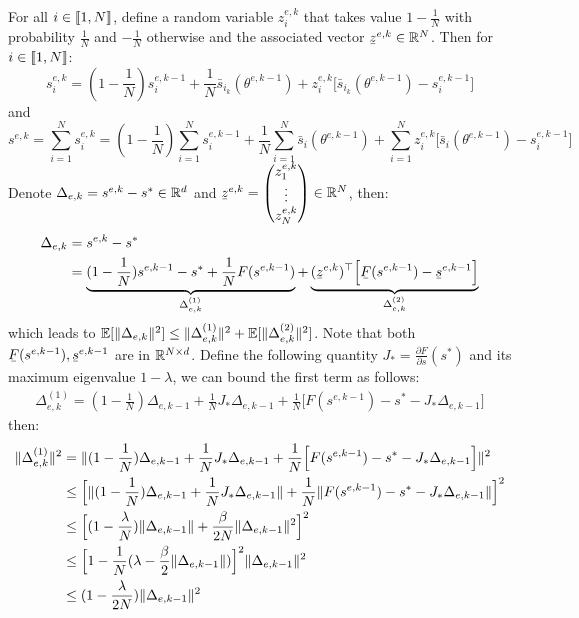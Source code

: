 For all $i \in \llbracket1,N\rrbracket$, define a random variable $z_i^{e,k}$ that takes value $1-\frac{1}{N}$ with probability $\frac{1}{N}$ and $-\frac{1}{N}$ otherwise and the associated vector $\barbelow{z}^{e,k} \in \rset^N$. Then for $i \in \llbracket1,N\rrbracket$:
\begin{equation}
s_i^{e,k} = (1-\frac{1}{N}) s_i^{e,k-1} + \frac{1}{N}\bar{s}_{i_k}(\theta^{e,k-1}) + z_i^{e,k} \Big[\bar{s}_{i_k}(\theta^{e,k-1}) - s_i^{e,k-1}\Big]
\end{equation}
and
\begin{equation}
s^{e,k} =  \sum_{i=1}^N s_i^{e,k} = (1-\frac{1}{N})  \sum_{i=1}^N s_i^{e,k-1} + \frac{1}{N}  \sum_{i=1}^N \bar{s}_i(\theta^{e,k-1}) +  \sum_{i=1}^N z_i^{e,k} \Big[\bar{s}_i(\theta^{e,k-1}) - s_i^{e,k-1}\Big]
\end{equation}
Denote $\Delta_{e,k} = s^{e,k} - s^* \in \mathbb{R}^{d}$ and  $\barbelow{z}^{e,k} = \begin{pmatrix} 
z_1^{e,k}  \\
\vdots  \\
z_N^{e,k}
\end{pmatrix} \in \rset^{N}$, then:
\begin{equation}
\begin{split}
\Delta_{e,k} & = s^{e,k} - s^* \\
& = \underbrace{(1-\frac{1}{N}) s^{e,k-1} - s^*  +  \frac{1}{N}  F(s^{e,k-1})}_{\Delta_{e,k}^{(1)}}  + \underbrace{(\barbelow{z}^{e,k})^\top \Big[ \barbelow{F}(s^{e,k-1}) - \barbelow{s}^{e,k-1} \Big]}_{\Delta_{e,k}^{(2)}}
\end{split}
\end{equation}
which leads to $\operatorname*{\mathbb{E}}[\lVert\Delta_{e,k}\rVert^2] \leq \lVert\Delta_{e,k}^{(1)}\rVert^2 + \operatorname*{\mathbb{E}}[\lVert\Delta_{e,k}^{(2)}\rVert^2] $. Note that both $\barbelow{F}(s^{e,k-1}), \barbelow{s}^{e,k-1}$ are in $\mathbb{R}^{N \times d}$.
Define the following quantity $J_* = \frac{\partial F}{\partial s}(s^*)$ and its maximum eigenvalue $1-\lambda$, we can bound the first term as follows:
\begin{equation}
\begin{split}
\Delta_{e,k}^{(1)} = (1-\frac{1}{N})\Delta_{e,k-1} + \frac{1}{N}J_* \Delta_{e,k-1} +  \frac{1}{N} \Big[ F(s^{e,k-1}) - s^* -J_* \Delta_{e,k-1}\Big]
\end{split}
\end{equation}
then:
\begin{equation}
\begin{split}
\lVert\Delta_{e,k}^{(1)}\rVert^2 & = \lVert(1-\frac{1}{N})\Delta_{e,k-1} + \frac{1}{N} J_* \Delta_{e,k-1} +  \frac{1}{N} \Big[ F(s^{e,k-1}) - s^* -J_* \Delta_{e,k-1}\Big]\rVert^2 \\
& \leq \Big[ \lVert(1-\frac{1}{N}) \Delta_{e,k-1} + \frac{1}{N}J_* \Delta_{e,k-1} \rVert + \frac{1}{N} \lVert F(s^{e,k-1}) - s^* -J_* \Delta_{e,k-1}\rVert\Big]^2 \\
& \leq \Big[ (1-\frac{\lambda}{N})\lVert\Delta_{e,k-1}\rVert + \frac{\beta}{2N} \lVert\Delta_{e,k-1}\rVert^2 \Big]^2\\
& \leq \Big[ 1 - \frac{1}{N}(\lambda - \frac{\beta}{2} \lVert\Delta_{e,k-1}\rVert) \Big]^2 \lVert\Delta_{e,k-1}\rVert^2\\
& \leq (1 - \frac{\lambda}{2N})\lVert\Delta_{e,k-1}\rVert^2
\end{split}
\end{equation}
